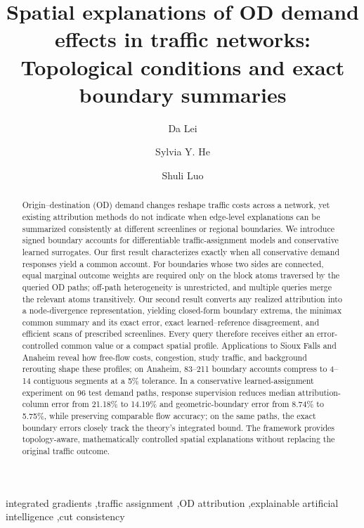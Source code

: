 \documentclass[a4paper,fleqn]{cas-sc}
\begin{document}
\title[mode=title]{Spatial explanations of OD demand effects in traffic networks: Topological conditions and exact boundary summaries}
\author[1]{Da Lei}
\author[2]{Sylvia Y. He}
\cormark[1]
\author[3]{Shuli Luo}
\begin{abstract}
Origin--destination (OD) demand changes reshape traffic costs across a network, yet existing attribution methods do not indicate when edge-level explanations can be summarized consistently at different screenlines or regional boundaries. We introduce signed boundary accounts for differentiable traffic-assignment models and conservative learned surrogates. Our first result characterizes exactly when all conservative demand responses yield a common account. For boundaries whose two sides are connected, equal marginal outcome weights are required only on the block atoms traversed by the queried OD paths; off-path heterogeneity is unrestricted, and multiple queries merge the relevant atoms transitively. Our second result converts any realized attribution into a node-divergence representation, yielding closed-form boundary extrema, the minimax common summary and its exact error, exact learned--reference disagreement, and efficient scans of prescribed screenlines. Every query therefore receives either an error-controlled common value or a compact spatial profile. Applications to Sioux Falls and Anaheim reveal how free-flow costs, congestion, study traffic, and background rerouting shape these profiles; on Anaheim, 83--211 boundary accounts compress to 4--14 contiguous segments at a 5\% tolerance. In a conservative learned-assignment experiment on 96 test demand paths, response supervision reduces median attribution-column error from 21.18\% to 14.19\% and geometric-boundary error from 8.74\% to 5.75\%, while preserving comparable flow accuracy; on the same paths, the exact boundary errors closely track the theory's integrated bound. The framework provides topology-aware, mathematically controlled spatial explanations without replacing the original traffic outcome.
\end{abstract}
\begin{keywords}
integrated gradients \sep traffic assignment \sep OD attribution \sep explainable artificial intelligence \sep cut consistency
\end{keywords}
\maketitle
{}
\end{document}
